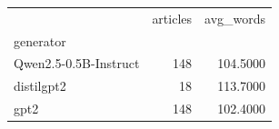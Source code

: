 \begin{tabular}{lrr}
\toprule
 & articles & avg_words \\
generator &  &  \\
\midrule
Qwen2.5-0.5B-Instruct & 148 & 104.5000 \\
distilgpt2 & 18 & 113.7000 \\
gpt2 & 148 & 102.4000 \\
\bottomrule
\end{tabular}
